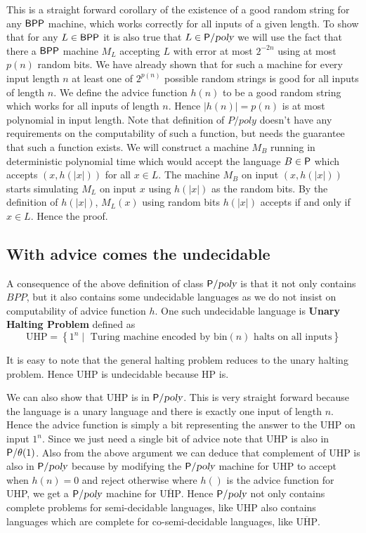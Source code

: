 \documentclass[11pt]{article}
\begin{document}
This is a straight forward corollary of the existence of a good random
string for any $\BPP$ machine, which works correctly for all inputs of
a given length. To show that for any $L\in \BPP$ it is also true that
$L\in \P/\poly$ we will use the fact that there a $\BPP$ machine $M_L$
accepting $L$ with error at most $2^{-2n}$ using at most $p(n)$ random
bits. We have already shown that for such a machine for every input
length $n$ at least one of $2^{p(n)}$ possible random strings is good
for all inputs of length $n$. We define the advice function $h(n)$ to
be a good random string which works for all inputs of length
$n$. Hence $|h(n)|=p(n)$ is at most polynomial in input length. Note
that definition of $P/poly$ doesn't have any requirements on the
computability of such a function, but needs the guarantee that such a
function exists. We will construct a machine $M_B$ running in
deterministic polynomial time which would accept
the language $B \in \P$ which accepts $(x,h(|x|))$ for all $x\in
L$. The machine $M_B$ on input $(x,h(|x|))$ starts simulating $M_L$ on
input $x$ using $h(|x|)$ as the random bits. By the definition of
$h(|x|)$, $M_L(x)$ using random bits $h(|x|)$ accepts if and only if
$x\in L$. Hence the proof.

\subsection{With advice comes the undecidable}

A consequence of the above definition of class $\P/\poly$ is that it not
only contains $BPP$, but it also contains some undecidable languages
as we do not insist on computability of advice function $h$. One such
undecidable language is \textbf{Unary Halting Problem} defined as 
\begin{displaymath}
  \text{UHP} = \left\{   1^n \mid \text{ Turing machine encoded by
      bin}(n) \text{ halts on all inputs}  \right\}
\end{displaymath}

It is easy to note that the general halting problem reduces to the unary
halting problem. Hence UHP is undecidable because HP is. 

We can also show that UHP is in $\P/\poly$. This is very straight
forward because the language is a unary language and there is exactly
one input of length $n$. Hence the advice function is simply a bit
representing the answer to the UHP on input $1^n$. Since we just need
a single bit of advice note that UHP is also in $\P/\theta(1)$. Also
from the above argument we can deduce that complement of UHP is also
in $\P/\poly$ because by modifying the $\P/\poly$ machine for UHP to
accept when $h(n)=0$ and reject otherwise where $h()$ is the advice
function for UHP, we get a $\P/\poly$ machine for
$\overline{\text{UHP}}$. Hence $\P/\poly$ not only contains complete
problems for semi-decidable languages, like UHP also contains
languages which are complete for co-semi-decidable languages, like
$\overline{\text{UHP}}$.
\end{document}
